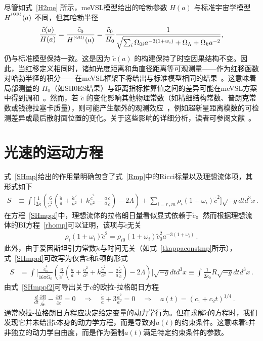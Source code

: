 \documentclass[jkps,preprint,fleqn]{revtex4}
\newcommand{\tc}{\tilde{c}}
\newcommand{\tG}{\tilde{G}}
\newcommand{\GR}{\text{GR}}
\newcommand{\tkapp}{\tilde{\kappa}}
\begin{document}
尽管如式~\eqref{H2me} 所示，meVSL模型给出的哈勃参数 $H(a)$ 与标准宇宙学模型 $H^{\textsuperscript{\tiny (\GR)}}(a)$ 不同，但其哈勃半径
\begin{equation}
    \frac{\tilde{c}(a)}{H(a)}  = \frac{\tc_0}{H^{\textsuperscript{\tiny (\GR)}}(a)} = \frac{\tilde{c}_0}{H_0} \frac{1}{\sqrt{\sum_i \Omega_{0i} a^{-3(1+w_i)} + \Omega_\Lambda + \Omega_k a^{-2}}},
\end{equation}
仍与标准模型保持一致。这是因为 $\tilde{c}(a)$ 的构建保持了时空因果结构不变。因此，当红移定义相同时，诸如光度距离和角直径距离等可观测量——作为红移函数对哈勃半径的积分——在meVSL框架下将给出与标准模型相同的结果~\cite{Lee:2020zts}。这意味着局部测量的 $H_0$（如SH0ES结果）与距离指标推算值之间的差异可能在meVSL方案中得到调和~\cite{Lee:2024nya}。然而，若 $\tilde{c}$ 的变化影响其他物理常数（如精细结构常数、普朗克常数或钱德拉塞卡质量），则可能产生额外的观测效应~\cite{Lee:2020zts,Lee:2021xwh}，例如超新星距离模数的可检测差异或最后散射面位置的变化。关于这些影响的详细分析，读者可参阅文献~\cite{Lee:2020zts}。
\section{光速的运动方程}
\label{sec:sol}

式~\eqref{SHmp}给出的作用量明确包含了式~\eqref{Rmp}中的Ricci标量以及理想流体项，其形式如下
\begin{align}
S &\equiv \int \Biggl[ \frac{1}{2 \tkapp} \left( \frac{6}{\tc^2} \left( \frac{\ddot{a}}{a} + \frac{\dot{a}^2}{a^2} + k \frac{\tc^2}{a^2} - \frac{\dot{a}}{a} \frac{\dot{\tc}}{ \tc} \right)  - 2 \Lambda \right) + \sum_{i=r\,,m} \rho_i (1 + \omega_i ) \tc^2 \Biggr] \sqrt{-g} dt d^3x \label{SHmppf} \,.
\end{align}
在方程~\eqref{SHmppf}中，理想流体的拉格朗日量看似显式依赖于$\tc$。然而根据理想流体的BI方程~\eqref{rhomp}可以证明，该项与$\tc$无关
\begin{align}
 \rho_i (1 + \omega_i ) \tc^2 =  \rho_{i0} (1 + \omega_i ) \tc_{0}^2 a^{-3(1 + \omega_i )}  \label{rhoi} \,.
\end{align}
此外，由于爱因斯坦引力常数$\tkapp$与时间无关（如式~\eqref{tkappaconstmp}所示），式~\eqref{SHmppf}可改写为仅含$\tc$和$\dot{\tc}$项的形式
\begin{align}
S &= \int \Biggl[ \frac{\tc_0^4}{16 \pi \tG_0} \left( \frac{6}{\tc^2} \left( \frac{\ddot{a}}{a} + \frac{\dot{a}^2}{a^2} + k \frac{\tc^2}{a^2} - \frac{\dot{a}}{a} \frac{\dot{\tc}}{ \tc} \right)  - 2 \Lambda \right)  \Biggr] \sqrt{-g} dt d^3x \equiv \int \frac{1}{2 \tkapp_0} R \sqrt{-g} dt d^3x \label{SHmppf2} \,.
\end{align}
由式~\eqref{SHmppf2}可导出关于$c$的欧拉-拉格朗日方程
\begin{align}
& \frac{d}{dt} \frac{\partial R}{\partial \dot{\tc}} - \frac{\partial R}{\partial \tc} = 0 \quad \Rightarrow \quad \frac{\ddot{a}}{a} + 3 \frac{\dot{a}^2}{a^2} = 0 \quad \Rightarrow \quad a(t) = (c_1 + c_2 t)^{1/4} \label{eomtc} \,.
\end{align}
通常欧拉-拉格朗日方程应决定给定变量的动力学行为。但在求解$\tc$的方程时，我们发现它并未给出$\tc$本身的动力学方程，而是导致对$a(t)$的约束条件。这意味着$\tc$并非独立的动力学自由度，而是作为强制$a(t)$满足特定约束条件的参数。
\end{document}
